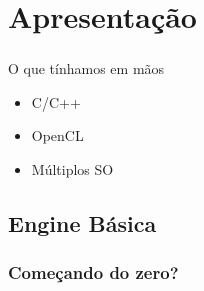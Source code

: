 \documentclass{beamer}
\begin{document}
\title{\assunto}  
\author{\allnames}
\date{\today} 

\frame{\titlepage} 



\section{Apresentação} 
\begin{frame}\frametitle{\assunto} 
O que tínhamos em mãos
\begin{itemize}
\item<2-> C/C++
\item<3-> OpenCL
\item<4-> Múltiplos SO
\end{itemize}
\end{frame}

\subsection{Engine Básica}
\begin{frame} \frametitle{Começando do zero?} 

\end{frame}
\end{document}
